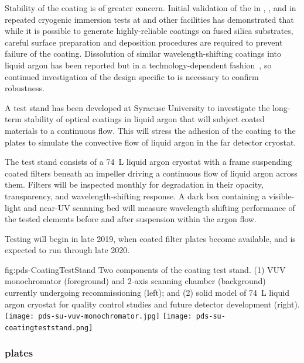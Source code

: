 Stability of the  coating is of greater concern.  Initial validation of the  in , , and in repeated cryogenic immersion tests at  and other facilities has demonstrated that while it is possible to generate highly-reliable  coatings on fused silica substrates, careful surface preparation and deposition procedures are required to prevent failure of the coating.  
Dissolution of similar wavelength-shifting coatings into liquid argon has been reported but in a technology-dependent fashion~\cite{Asaadi:2018ixs}, so continued investigation of the design specific to  is necessary to confirm robustness. 


A test stand has been developed at Syracuse University to investigate the long-term stability of  optical coatings in liquid argon that will
subject coated materials to a continuous flow. This will stress the adhesion of the coating to the plates to simulate the convective flow of liquid argon in the far detector cryostat.
 
The test stand consists of a \SI{74}{L} liquid argon cryostat with a frame suspending coated filters beneath an impeller driving a continuous flow of liquid argon across them. Filters will be inspected monthly for degradation in their opacity, transparency, and wavelength-shifting response. A dark box containing a visible-light and near-UV scanning bed will measure wavelength shifting performance of the tested elements before and after suspension within the argon flow.


Testing will begin in late 2019, when coated filter plates become available, and is expected to run through late 2020.

\begin{dunefigure}
 {fig:pds-CoatingTestStand}
 {Two components of the  coating test stand. (1) VUV monochromator (foreground) and 2-axis scanning chamber (background) 
 currently undergoing recommissioning (left); and (2) solid model of \SI{74}{L} liquid argon cryostat for quality control studies and future detector development (right).}
\texttt{[image: pds-su-vuv-monochromator.jpg]}
\hspace{0.02\textwidth}
\texttt{[image: pds-su-coatingteststand.png]}
\end{dunefigure}


\subsubsection{ plates}

